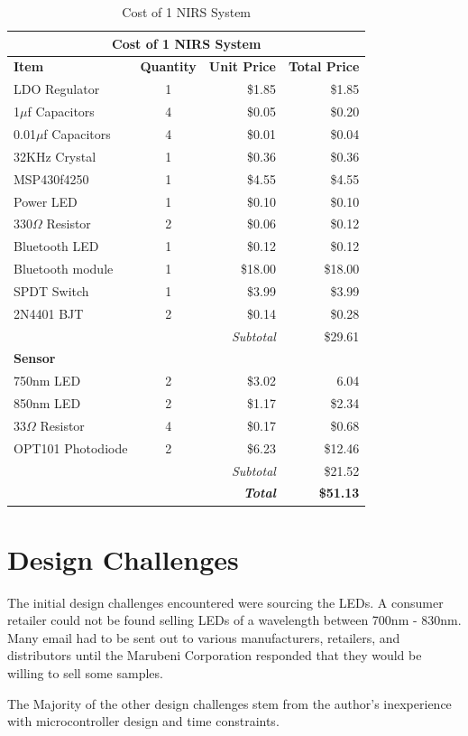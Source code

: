 \begin{table}
  \caption{Cost of 1 NIRS System}
  \begin{tabular}{| l | c | r | r |}
\hline
\multicolumn{4}{|c|}{Cost of 1 NIRS System} \\
\hline
\bf Item & \bf Quantity & \bf Unit Price & \bf Total Price \\ \hline
LDO Regulator&1&\$1.85&\$1.85\\
1$\mu$f Capacitors&4&\$0.05&\$0.20\\
0.01$\mu$f Capacitors&4&\$0.01&\$0.04\\
32KHz Crystal&1&\$0.36&\$0.36\\
MSP430f4250&1&\$4.55&\$4.55\\
Power LED&1&\$0.10&\$0.10\\
330$\Omega$ Resistor&2&\$0.06&\$0.12\\
Bluetooth LED&1&\$0.12&\$0.12\\
Bluetooth module&1&\$18.00&\$18.00\\
SPDT Switch&1&\$3.99&\$3.99\\
2N4401 BJT&2&\$0.14&\$0.28\\ \hline
\multicolumn{3}{|r}{\em Subtotal}&\$29.61 \\ \hline
\multicolumn{4}{|l|}{\bf Sensor} \\ \hline
750nm LED&2&\$3.02&6.04\\
850nm LED&2&\$1.17&\$2.34\\
33$\Omega$ Resistor&4&\$0.17&\$0.68\\
OPT101 Photodiode&2&\$6.23&\$12.46\\ \hline
\multicolumn{3}{|r}{\em Subtotal}&\$21.52 \\ 
\multicolumn{3}{|r}{\bf \em Total}&\bf \$51.13 \\
\hline
  \end{tabular}
\end{table}

\section{Design Challenges}
The initial design challenges encountered were sourcing the LEDs. A consumer retailer could not be found selling LEDs of a wavelength between 700nm - 830nm. Many email had to be sent out to various manufacturers, retailers, and distributors until the Marubeni Corporation responded that they would be willing to sell some samples.

The Majority of the other design challenges stem from the author's inexperience with microcontroller design and time constraints. 

